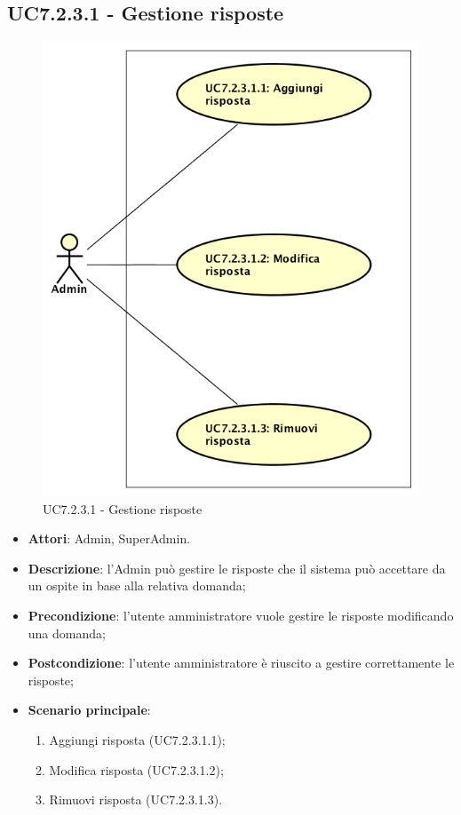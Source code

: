 \documentclass[../AnalisiDeiRequisiti_v4.0.0.tex]{subfiles}
\begin{document}
\subsection{UC7.2.3.1 - Gestione risposte} 
\label{sssec:UC7.2.3.1} 
\begin{figure}[!h]
	\centering
	\includegraphics[scale=0.7]{UseCases/UC7_GestionePannelloAdmin/UC7_2_GestioneDomande/UC7_2_3_ModificaDomanda/UC7_2_3_1_GestioneRisposte/UC7_2_3_1_GestioneRisposte.png}
	\caption{UC7.2.3.1 - Gestione risposte}
\end{figure}
\begin{itemize} 
\item \textbf{Attori}: Admin, SuperAdmin.
\item \textbf{Descrizione}: l'Admin può gestire le risposte che il sistema può accettare da un ospite in base alla relativa domanda;
\item \textbf{Precondizione}: l'utente amministratore vuole gestire le risposte modificando una domanda;
\item \textbf{Postcondizione}: l'utente amministratore è riuscito a gestire correttamente le risposte;
\item \textbf{Scenario principale}: \begin{enumerate}\item Aggiungi risposta (UC7.2.3.1.1);\item Modifica risposta (UC7.2.3.1.2);\item Rimuovi risposta (UC7.2.3.1.3).
 \end{enumerate}
\end{itemize} 
\newpage
\end{document}
